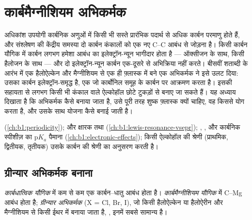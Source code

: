 \chapter{कार्बमैग्नीशियम अभिकर्मक}\label{ch:b1:organomagnesium}

अधिकांश उपयोगी कार्बनिक अणुओं में किसी भी सस्ते प्रारंभिक पदार्थ से अधिक
कार्बन परमाणु होते हैं, और संश्लेषण की केंद्रीय समस्या दो कार्बन कंकालों को एक
नए C--C आबंध से जोड़ना है। किसी कार्बन यौगिक में कार्बन लगभग
हमेशा आबंध का इलेक्ट्रॉन-न्यून भागीदार होता है --- ऑक्सीजन के साथ, किसी
हैलोजन के साथ --- और दो इलेक्ट्रॉन-न्यून कार्बन एक-दूसरे से अभिक्रिया नहीं करते।
बीसवीं शताब्दी के आरंभ में एक हैलोऐल्केन और मैग्नीशियम से एक ही फ़्लास्क में बने
एक अभिकर्मक ने इसे उलट दिया: उसका कार्बन इलेक्ट्रॉन-समृद्ध है,
एक  जो कार्बोनिल समूह के कार्बन पर आक्रमण करता है। इसकी सहायता से
लगभग किसी भी कंकाल वाले ऐल्कोहॉल छोटे टुकड़ों से बनाए जा सकते हैं। यह
अध्याय दिखाता है कि अभिकर्मक कैसे बनाया जाता है, उसे पूरी तरह शुष्क
फ़्लास्क क्यों चाहिए, वह किससे योग करता है, और उसके साथ योजना कैसे बनाई जाती है।

\begin{recall}
 (\cref{ch:b1:periodicity});  और क्षारक तथा
 (\cref{ch:b1:lewis-resonance-vsepr}); ,
,  और कार्बनिक स्पीशीज़ का $\mathrm{p}K_a$
पैमाना (\cref{ch:b1:electronic-effects}); किसी ऐल्कोहॉल की श्रेणी
(प्राथमिक, द्वितीयक, तृतीयक) उसके कार्बन की श्रेणी का अनुसरण करती है।
\end{recall}

\section{ग्रीन्यार अभिकर्मक बनाना}

\begin{definition}[कार्बधात्विक यौगिक, ग्रीन्यार अभिकर्मक]\label{def:b1:organomagnesium:organometallic}
\emph{कार्बधात्विक यौगिक} में
कम से कम एक कार्बन--धातु आबंध होता है। \emph{कार्बमैग्नीशियम
यौगिक} में C--Mg आबंध होता है;
\emph{ग्रीन्यार अभिकर्मक}  (X = Cl, Br, I),
जो किसी हैलोऐल्केन या हैलोऐरीन और मैग्नीशियम से किसी ईथर में बनाया जाता है,
, इनमें सबसे सामान्य है।
\end{definition}

